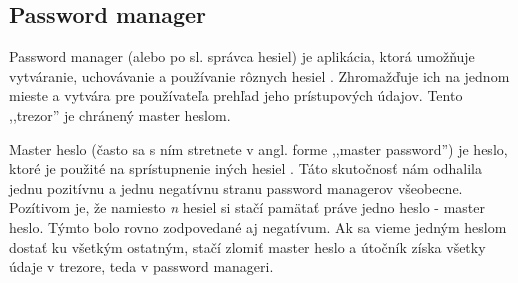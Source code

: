 \subsection{Password manager}
Password manager (alebo po sl. správca hesiel) je aplikácia, ktorá umožňuje vytváranie, uchovávanie a používanie rôznych hesiel \cite{6}. Zhromažďuje ich na jednom mieste a vytvára pre používateľa prehľad jeho prístupových údajov. Tento ,,trezor'' je chránený master heslom.
\par Master heslo (často sa s ním stretnete v angl. forme ,,master password'') je heslo, ktoré je použité na sprístupnenie iných hesiel \cite{7}. Táto skutočnosť nám odhalila jednu pozitívnu a jednu negatívnu stranu password managerov všeobecne. Pozítivom je, že namiesto \textit{n} hesiel si stačí pamätať práve jedno heslo - master heslo. Týmto bolo rovno zodpovedané aj negatívum. Ak sa vieme jedným heslom dostať ku všetkým ostatným, stačí zlomiť master heslo a útočník získa všetky údaje v trezore, teda v password manageri.